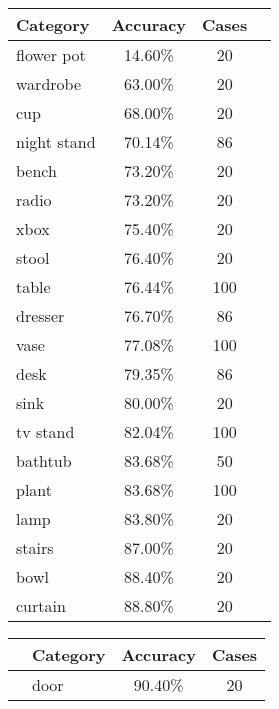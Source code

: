 \begin{table}[]
	\centering
	\begin{tabular}[t]{lccl}
		\hline
		\textbf{Category} & \textbf{Accuracy} & \textbf{Cases} & \hspace{4pt}\\ \hline
		flower pot        & 14.60\%           & 20             & \\
		wardrobe          & 63.00\%           & 20             & \\
		cup               & 68.00\%           & 20             & \\
		night stand       & 70.14\%           & 86             & \\
		bench             & 73.20\%           & 20             & \\
		radio             & 73.20\%           & 20             & \\
		xbox              & 75.40\%           & 20             & \\
		stool             & 76.40\%           & 20             & \\
		table             & 76.44\%           & 100            & \\
		dresser           & 76.70\%           & 86             & \\
		vase              & 77.08\%           & 100            & \\
		desk              & 79.35\%           & 86             & \\
		sink              & 80.00\%           & 20             & \\
		tv stand          & 82.04\%           & 100            & \\
		bathtub           & 83.68\%           & 50             & \\
		plant             & 83.68\%           & 100            & \\
		lamp              & 83.80\%           & 20             & \\
		stairs            & 87.00\%           & 20             & \\
		bowl              & 88.40\%           & 20             & \\
		curtain           & 88.80\%           & 20 & \\ \hline
	\end{tabular}
	\begin{tabular}[t]{llcc}
		\hline
	 &	\textbf{Category} & \textbf{Accuracy} & \textbf{Cases} \\ \hline
	\hspace{4pt} &	door              & 90.40\%           & 20             \\

\end{tabular}
\end{table}
